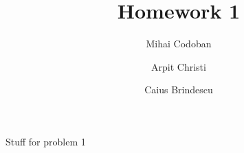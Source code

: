 \documentclass{article}
\title{Homework 1}
\author{Mihai Codoban \and Arpit Christi \and Caius Brindescu}
\begin{document}
\maketitle


Stuff for problem 1



\end{document}
